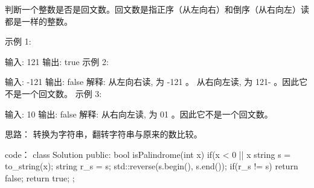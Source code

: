 判断一个整数是否是回文数。回文数是指正序（从左向右）和倒序（从右向左）读都是一样的整数。

示例 1:

输入: 121
输出: true
示例 2:

输入: -121
输出: false
解释: 从左向右读, 为 -121 。 从右向左读, 为 121- 。因此它不是一个回文数。
示例 3:

输入: 10
输出: false
解释: 从右向左读, 为 01 。因此它不是一个回文数。


思路：
转换为字符串，翻转字符串与原来的数比较。















code：
class Solution {
public:
    bool isPalindrome(int x) {
        if(x < 0 || x %
        string s = to_string(x);
        string r_s = s;
        std::reverse(s.begin(), s.end());
        if(r_s != s) return false;
        return true;
    }
};